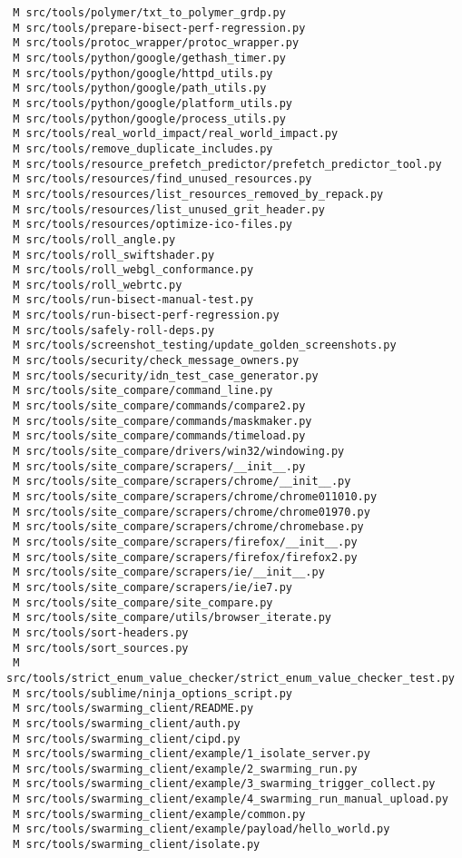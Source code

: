 \documentclass{article}
\begin{document}
\begin{verbatim}
 M src/tools/polymer/txt_to_polymer_grdp.py
 M src/tools/prepare-bisect-perf-regression.py
 M src/tools/protoc_wrapper/protoc_wrapper.py
 M src/tools/python/google/gethash_timer.py
 M src/tools/python/google/httpd_utils.py
 M src/tools/python/google/path_utils.py
 M src/tools/python/google/platform_utils.py
 M src/tools/python/google/process_utils.py
 M src/tools/real_world_impact/real_world_impact.py
 M src/tools/remove_duplicate_includes.py
 M src/tools/resource_prefetch_predictor/prefetch_predictor_tool.py
 M src/tools/resources/find_unused_resources.py
 M src/tools/resources/list_resources_removed_by_repack.py
 M src/tools/resources/list_unused_grit_header.py
 M src/tools/resources/optimize-ico-files.py
 M src/tools/roll_angle.py
 M src/tools/roll_swiftshader.py
 M src/tools/roll_webgl_conformance.py
 M src/tools/roll_webrtc.py
 M src/tools/run-bisect-manual-test.py
 M src/tools/run-bisect-perf-regression.py
 M src/tools/safely-roll-deps.py
 M src/tools/screenshot_testing/update_golden_screenshots.py
 M src/tools/security/check_message_owners.py
 M src/tools/security/idn_test_case_generator.py
 M src/tools/site_compare/command_line.py
 M src/tools/site_compare/commands/compare2.py
 M src/tools/site_compare/commands/maskmaker.py
 M src/tools/site_compare/commands/timeload.py
 M src/tools/site_compare/drivers/win32/windowing.py
 M src/tools/site_compare/scrapers/__init__.py
 M src/tools/site_compare/scrapers/chrome/__init__.py
 M src/tools/site_compare/scrapers/chrome/chrome011010.py
 M src/tools/site_compare/scrapers/chrome/chrome01970.py
 M src/tools/site_compare/scrapers/chrome/chromebase.py
 M src/tools/site_compare/scrapers/firefox/__init__.py
 M src/tools/site_compare/scrapers/firefox/firefox2.py
 M src/tools/site_compare/scrapers/ie/__init__.py
 M src/tools/site_compare/scrapers/ie/ie7.py
 M src/tools/site_compare/site_compare.py
 M src/tools/site_compare/utils/browser_iterate.py
 M src/tools/sort-headers.py
 M src/tools/sort_sources.py
 M src/tools/strict_enum_value_checker/strict_enum_value_checker_test.py
 M src/tools/sublime/ninja_options_script.py
 M src/tools/swarming_client/README.py
 M src/tools/swarming_client/auth.py
 M src/tools/swarming_client/cipd.py
 M src/tools/swarming_client/example/1_isolate_server.py
 M src/tools/swarming_client/example/2_swarming_run.py
 M src/tools/swarming_client/example/3_swarming_trigger_collect.py
 M src/tools/swarming_client/example/4_swarming_run_manual_upload.py
 M src/tools/swarming_client/example/common.py
 M src/tools/swarming_client/example/payload/hello_world.py
 M src/tools/swarming_client/isolate.py

\end{verbatim}
\end{document}
